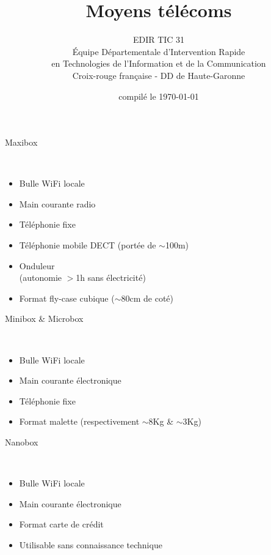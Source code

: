 \documentclass{beamer}
\begin{document}
\date{compilé le \today}
\title{Moyens télécoms}
\author{
	EDIR TIC 31\\
	\small{
        Équipe Départementale d’Intervention Rapide\\
        en Technologies de l’Information et de la Communication\\
        Croix-rouge française - DD de Haute-Garonne
    }
}

\begin{frame}
	\titlepage
\end{frame}

\begin{frame}
    \begin{huge}Maxibox\end{huge}
    \vspace{0.5cm}
    \\
    \begin{itemize}
        \item Bulle WiFi locale
        \item Main courante radio
        \item Téléphonie fixe
        \item Téléphonie mobile DECT (portée de $\sim$100m)
        \item Onduleur \\ (autonomie $>$1h sans électricité)
        \item Format fly-case cubique ($\sim$80cm de coté)
    \end{itemize}
\end{frame}

\begin{frame}
    \begin{huge}Minibox \& Microbox\end{huge}
    \vspace{0.5cm}
    \\
    \begin{itemize}
        \item Bulle WiFi locale
        \item Main courante électronique
        \item Téléphonie fixe
        \item Format malette (respectivement $\sim$8Kg \& $\sim$3Kg)
    \end{itemize}
\end{frame}

\begin{frame}
    \begin{huge}Nanobox\end{huge}
    \vspace{0.5cm}
    \\
    \begin{itemize}
        \item Bulle WiFi locale
        \item Main courante électronique
        \item Format carte de crédit
        \item Utilisable sans connaissance technique
    \end{itemize}
\end{frame}
\end{document}
